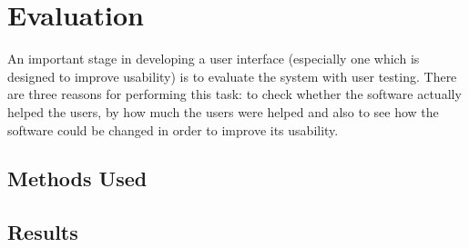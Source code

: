 \chapter{Evaluation}

An important stage in developing a user interface (especially one which is designed to improve usability) is to evaluate the system with user testing. There are three reasons for performing this task: to check whether the software actually helped the users, by how much the users were helped and also to see how the software could be changed in order to improve its usability.

\section{Methods Used}

\section{Results}